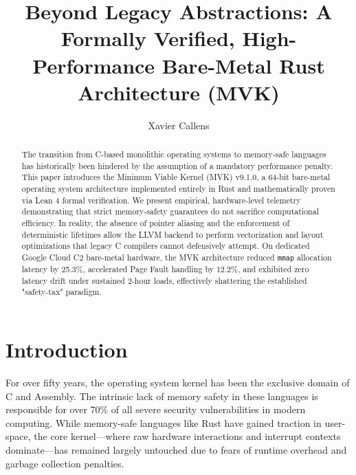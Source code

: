 \documentclass[sigconf]{acmart}
\begin{document}
\title{Beyond Legacy Abstractions: A Formally Verified, High-Performance Bare-Metal Rust Architecture (MVK)}

\author{Xavier Callens}

\begin{abstract}
The transition from C-based monolithic operating systems to memory-safe languages has historically been hindered by the assumption of a mandatory performance penalty. This paper introduces the Minimum Viable Kernel (MVK) v9.1.0, a 64-bit bare-metal operating system architecture implemented entirely in Rust and mathematically proven via Lean 4 formal verification. We present empirical, hardware-level telemetry demonstrating that strict memory-safety guarantees do not sacrifice computational efficiency. In reality, the absence of pointer aliasing and the enforcement of deterministic lifetimes allow the LLVM backend to perform vectorization and layout optimizations that legacy C compilers cannot defensively attempt. On dedicated Google Cloud C2 bare-metal hardware, the MVK architecture reduced \texttt{mmap} allocation latency by 25.3\%, accelerated Page Fault handling by 12.2\%, and exhibited zero latency drift under sustained 2-hour loads, effectively shattering the established "safety-tax" paradigm.
\end{abstract}


\maketitle

\section{Introduction}
For over fifty years, the operating system kernel has been the exclusive domain of C and Assembly. The intrinsic lack of memory safety in these languages is responsible for over 70\% of all severe security vulnerabilities in modern computing. While memory-safe languages like Rust have gained traction in user-space, the core kernel---where raw hardware interactions and interrupt contexts dominate---has remained largely untouched due to fears of runtime overhead and garbage collection penalties.
\end{document}
